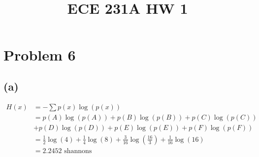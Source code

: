 
\title{ECE 231A HW 1}

\maketitle

\section*{Problem 6}
\subsection*{(a)}
\begin{align*}
	H(x)&=-\sum p(x)\log(p(x))\\
	&=p(A)\log(p(A))+p(B)\log(p(B))+p(C)\log(p(C))\\&+p(D)\log(p(D))+p(E)\log(p(E))+p(F)\log(p(F))\\
	&=\frac{1}{2}\log(4)+\frac{1}{4}\log(8)+\frac{3}{16}\log(\frac{16}{3})+\frac{1}{16}\log(16)\\
	&=\boxed{2.2452\text{ shannons}}
\end{align*}

